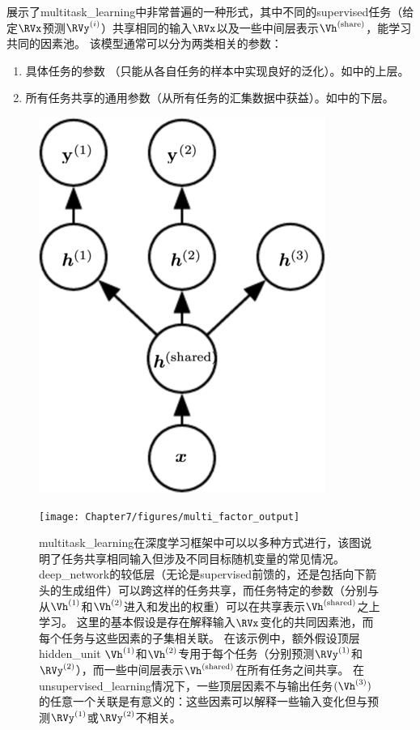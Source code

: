 展示了\gls{multitask_learning}中非常普遍的一种形式，其中不同的\gls{supervised}任务（给定$\RVx$预测$\RVy^{(i)}$）共享相同的输入$\RVx$以及一些中间层表示$\Vh^{(\text{share})}$，能学习共同的因素池。
该模型通常可以分为两类相关的参数：
\begin{enumerate}
 \item 具体任务的参数 （只能从各自任务的样本中实现良好的泛化）。如中的上层。
 \item 所有任务共享的通用参数（从所有任务的汇集数据中获益）。如中的下层。
\end{enumerate}
\begin{figure}[!htb]
\ifOpenSource
\centerline{\includegraphics[scale=0.5]{images/55.png}}
\else
\centerline{\texttt{[image: Chapter7/figures/multi\_factor\_output]}}
\fi
\caption{\gls{multitask_learning}在深度学习框架中可以以多种方式进行，该图说明了任务共享相同输入但涉及不同目标随机变量的常见情况。
\gls{deep_network}的较低层（无论是\gls{supervised}前馈的，还是包括向下箭头的生成组件）可以跨这样的任务共享，而任务特定的参数（分别与从$\Vh^{(1)}$和$\Vh^{(2)}$进入和发出的权重）可以在共享表示$\Vh^{(\text{shared})}$之上学习。
这里的基本假设是存在解释输入$\RVx$变化的共同因素池，而每个任务与这些因素的子集相关联。
在该示例中，额外假设顶层\gls{hidden_unit} $\Vh^{(1)}$和$\Vh^{(2)}$专用于每个任务（分别预测$\RVy^{(1)}$和$\RVy^{(2)}$），而一些中间层表示$\Vh^{(\text{shared})}$在所有任务之间共享。
在\gls{unsupervised_learning}情况下，一些顶层因素不与输出任务$(\Vh^{(3)})$的任意一个关联是有意义的：这些因素可以解释一些输入变化但与预测$\RVy^{(1)}$或$\RVy^{(2)}$不相关。
}
\label{fig:chap7_multi_factor_output}
\end{figure}

